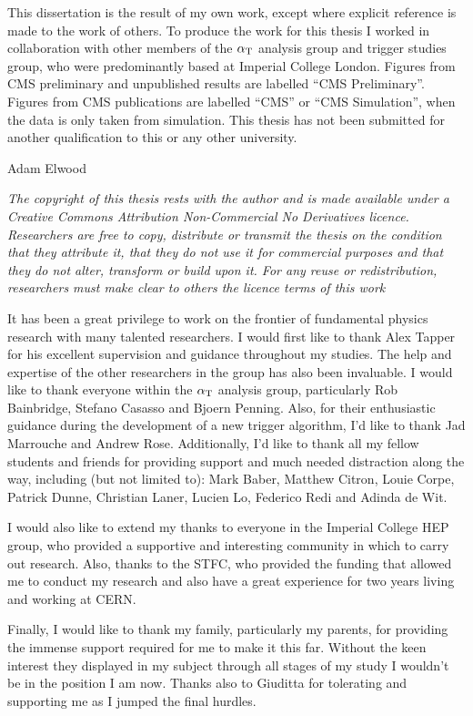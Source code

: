 \begin{declaration}
  This dissertation is the result of my own work, except where
  explicit reference is made to the work of others. To produce the
  work for this thesis I worked in collaboration with other members of
  the $\alpha_{\text{T}}$ analysis group and trigger studies group, who were
  predominantly based at Imperial College London. Figures from CMS
  preliminary and unpublished results are labelled ``CMS
  Preliminary''. Figures from CMS publications are labelled ``CMS'' or
  ``CMS Simulation'', when the data is only taken from simulation. This
  thesis has not been submitted for another qualification to this or
  any other university. 
  \vspace*{1cm}
  \begin{flushright}
    Adam Elwood
  \end{flushright}
  \vspace*{1cm}
  {\it The copyright of this thesis rests with the author and is made
  available under a Creative Commons Attribution Non-Commercial No
  Derivatives licence. Researchers are free to copy, distribute or
  transmit the thesis on the condition that they attribute it, that
  they do
  not use it for commercial purposes and that they do not alter,
  transform or build upon it. For any reuse or redistribution,
  researchers must make clear to others the licence terms of this
  work}
\end{declaration}


\begin{acknowledgements}
It has been a great privilege to work on the frontier of fundamental
physics research with many talented researchers. I would first like to
thank Alex Tapper for his excellent supervision and guidance
throughout my studies. The help and expertise of the
other researchers in the group has also been invaluable. I would like to
thank everyone within the $\alpha_{\text{T}}$ analysis group, particularly Rob
Bainbridge, Stefano Casasso and Bjoern Penning. Also, for their enthusiastic
guidance during the development of a new trigger algorithm, I'd like to
thank Jad Marrouche and Andrew Rose. Additionally, I'd like to thank
all my fellow students and friends for providing support and much
needed distraction along the way, including (but not limited to): Mark
Baber, Matthew Citron, Louie Corpe, Patrick Dunne, Christian Laner,
Lucien Lo, Federico Redi and Adinda de Wit.

I would also like to extend my thanks to everyone in the Imperial
College HEP group, who provided a supportive and interesting community
in which to carry out research. Also, thanks to the STFC,
who provided the funding that allowed me to conduct my research and
also have a great experience for two years living and working at CERN.

Finally, I would like to thank my family, particularly my parents, for
providing the immense support required for me to make it this far.
Without the keen interest they displayed in my subject through all
stages of my study I wouldn't be in the position I am now. Thanks
also to Giuditta for tolerating and supporting me as I jumped the
final hurdles.
\end{acknowledgements}


